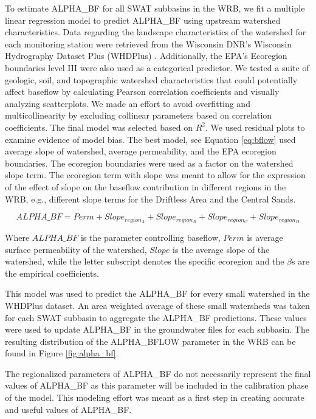 	To estimate ALPHA\_BF for all SWAT subbasins in the WRB, we fit a multiple linear regression model to predict ALPHA\_BF using upstream watershed characteristics. Data regarding the landscape characteristics of the watershed for each monitoring station were retrieved from the Wisconsin DNR's Wisconsin Hydrography Dataset Plus (WHDPlus) \citep{wdnr_whdplus_2013}. Additionally, the EPA's Ecoregion boundaries level III were also used as a categorical predictor. We tested a suite of geologic, soil, and topographic watershed characteristics that could potentially affect baseflow by calculating Pearson correlation coefficients and visually analyzing scatterplots. We made an effort to avoid overfitting and multicollinearity by excluding collinear parameters based on correlation coefficients. The final model was selected based on $R^2$. We used residual plots to examine evidence of model bias. The best model, see Equation \ref{eq:bflow} used average slope of watershed, average permeability, and the EPA ecoregion boundaries. The ecoregion boundaries were used as a factor on the watershed slope term. The ecoregion term with slope was meant to allow for the expression of the effect of slope on the baseflow contribution in different regions in the WRB, e.g., different slope terms for the Driftless Area and the Central Sands.

	
	\begin{equation}
		ALPHA\_BF = Perm + Slope_{region_A} + Slope_{region_B} + Slope_{region_C} + Slope_{region_D}
		\label{eq:bflow}
	\end{equation}
	
	Where $ALPHA\_BF$ is the parameter controlling baseflow, $Perm$ is average surface permeability of the watershed, $Slope$ is the average slope of the watershed, while the letter subscript denotes the specific ecoregion and the $\beta$s are the empirical coefficients.
	
	This model was used to predict the ALPHA\_BF for every small watershed in the WHDPlus dataset. An area weighted average of these small watersheds was taken for each SWAT subbasin to aggregate the ALPHA\_BF predictions. These values were used to update ALPHA\_BF in the groundwater files for each subbasin. The resulting distribution of the ALPHA\_BFLOW parameter in the WRB can be found in Figure \ref{fig:alpha_bf}.
	
	The regionalized parameters of ALPHA\_BF do not necessarily represent the final values of ALPHA\_BF as this parameter will be included in the calibration phase of the model. This modeling effort was meant as a first step in creating accurate and useful values of ALPHA\_BF.
